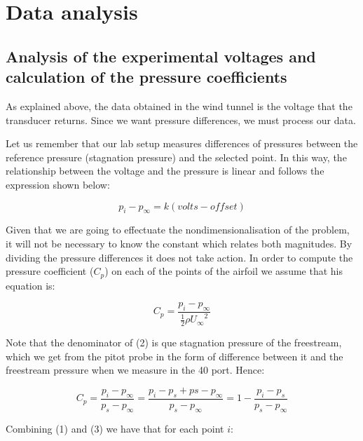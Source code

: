 \documentclass[10pt]{SelfArx} %
\begin{document}

\section{Data analysis}

\subsection{Analysis of the experimental voltages and \\
calculation of the pressure coefficients}

As explained above, the data obtained in the wind tunnel is the voltage that the transducer returns. Since we want pressure differences, we must process our data.

Let us remember that our lab setup measures differences of pressures between the reference pressure (stagnation pressure) and the selected point. In this way, the relationship between the voltage and the pressure is linear and follows the expression shown below: 

\begin{equation} p_{i} - p_{\infty} = k (volts - offset) \end{equation}

Given that we are going to effectuate the nondimensionalisation of the problem, it will not be necessary to know the constant which relates both magnitudes. By dividing the pressure differences it does not take action. In order to compute the pressure coefficient ($C_{p}$) on each of the points of the airfoil we assume that his equation is: 

\begin{equation} C_{p} = \frac{p_{i} - p_{\infty}}{\frac{1}{2} \rho {U_{\infty}}^{2}} \end{equation}

Note that the denominator of (2) is que stagnation pressure of the freestream, which we get from the pitot probe in the form of difference between it and the freestream pressure when we measure in the 40 port. Hence:

\begin{equation} C_{p} = \frac{p_{i} - p_{\infty}}{p_{s} - p_{\infty}} = \frac{p_{i} - p_{s} + p{s} - p_{\infty}}{p_{s} - p_{\infty}} = 1 - \frac{p_{i} - p_{s}}{p_{s} - p_{\infty}} \end{equation}


Combining (1) and (3) we have that for each point $i$:
\end{document}
